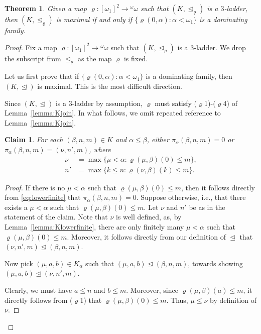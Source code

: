 \documentclass[]{amsart}
\newtheorem{theorem}{Theorem}[section]
\newtheorem{claim}{Claim}[theorem]
\theoremstyle{definition}
\theoremstyle{remark}
\begin{document}
\begin{theorem}\label{thm:Kmaximal}
Given a map $\varrho:[\omega_1]^2 \rightarrow {}^\omega \omega$ such that $(K, \trianglelefteq_\varrho)$ is a $3$-ladder, then $(K, \trianglelefteq_\varrho)$ is maximal if and only if $\{\varrho(0, \alpha) : \alpha < \omega_1\}$ is a dominating family.
\end{theorem}
\begin{proof}
Fix a map $\varrho:[\omega_1]^2 \rightarrow {}^\omega \omega$ such that $(K, \trianglelefteq_\varrho)$ is a $3$-ladder. We drop the subscript from $\trianglelefteq_\varrho$ as the map $\varrho$ is fixed.  

Let us first prove that if $\{\varrho(0, \alpha) : \alpha < \omega_1\}$ is a dominating family, then $(K, \trianglelefteq)$ is maximal.  This is the most difficult direction.

Since $(K, \trianglelefteq)$ is a $3$-ladder by assumption, $\varrho$ must satisfy ($\varrho$1)-($\varrho$4) of Lemma~\ref{lemma:Kjoin}. In what follows, we omit repeated reference to Lemma~\ref{lemma:Kjoin}.

\begin{claim}\label{thm:dominating:claim2}
For each $(\beta, n, m) \in K$ and $\alpha \le \beta$, either $\pi_\alpha (\beta,n, m) = 0$ or $\pi_\alpha (\beta,n, m) = (\nu, n', m)$, where 
\begin{align*}
\nu &= \max \{\mu < \alpha : \varrho(\mu, \beta)(0) \le m\},\\
n' &= \max \{k \le n : \varrho(\nu, \beta)(k) \le m\}.
\end{align*}
\end{claim}
\begin{proof}
If there is no $\mu < \alpha$ such that $\varrho(\mu, \beta)(0) \le m$, then it follows directly from \eqref{eq:lowerfinite} that $\pi_\alpha (\beta, n, m) = 0$. Suppose otherwise, i.e., that there exists a $\mu < \alpha$ such that $\varrho(\mu, \beta)(0) \le m$. Let $\nu$ and $n'$ be as in the statement of the claim. Note that $\nu$ is well defined, as, by Lemma~\ref{lemma:Klowerfinite}, there are only finitely many $\mu < \alpha$ such that $\varrho(\mu, \beta)(0) \le m$. Moreover, it follows directly from our definition of $\trianglelefteq$ that $(\nu, n', m) \trianglelefteq (\beta, n ,m)$.

Now pick $(\mu, a, b) \in K_\alpha$ such that $(\mu, a, b) \trianglelefteq (\beta, n, m)$, towards showing $(\mu, a, b) \trianglelefteq (\nu, n', m)$.

Clearly, we must have $a \le n$ and $b \le m$. Moreover, since $\varrho(\mu, \beta)(a) \le m$, it directly follows from ($\varrho$1) that $\varrho(\mu, \beta)(0) \le m$. Thus, $\mu \le \nu$ by definition of $\nu$. 


\end{proof}
\end{proof}
\end{document}

